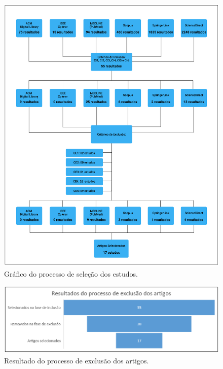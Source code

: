 \begin{figure}[htb]
	\caption{\label{fig_graficoProcessoInclusaoExclusaoArtigos}Gráfico do processo de seleção dos estudos.}
	\begin{center}
	    \includegraphics[scale=0.4]{Imagens/grafico - processo de selecao dos estudos.png}
	\end{center}
\end{figure}

\begin{figure}[htb]
	\caption{\label{fig_graficoResultadoProcessoExclusao}Resultado do processo de exclusão dos artigos.}
	\begin{center}
	    \includegraphics[scale=0.5]{Imagens/grafico - resultado da fase de exclusao dos artigos.png}
	\end{center}
\end{figure}

